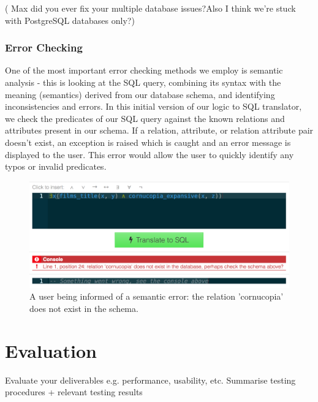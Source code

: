 \documentclass[a4paper, 11pt]{article}
\begin{document}
      ( Max did you ever fix your multiple database issues?Also I think we're
      stuck with PostgreSQL databases only?) 

      \subsubsection{Error Checking}


      One of the most important error checking methods we employ is semantic
      analysis - this is looking at the SQL query, combining its syntax with
      the meaning (semantics) derived from our database schema, and identifying
      inconsistencies and errors. In this initial version of our logic to SQL
      translator, we check the predicates of our SQL query against the known
      relations and attributes present in our schema. If a relation, attribute,
      or relation attribute pair doesn't exist, an exception is raised which is
      caught and an error message is displayed to the user. This error would
      allow the user to quickly identify any typos or invalid predicates.

      \begin{figure}[h!]
        \centering
        \includegraphics[width=1.0\textwidth]{images/error.png}
        \caption{A user being informed of a semantic error: the relation
          'cornucopia' does not exist in the schema.}
      \end{figure}

\section{Evaluation}
  Evaluate your deliverables e.g. performance, usability, etc.
  Summarise testing procedures + relevant testing results
\end{document}
